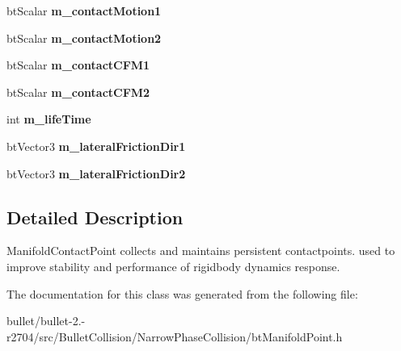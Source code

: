 \begin{DoxyCompactItemize}
\item 
\hypertarget{classbt_manifold_point_af980e3d3ddc888ea84fdb7bd9ed47a51}{bt\+Scalar {\bfseries m\+\_\+contact\+Motion1}}\label{classbt_manifold_point_af980e3d3ddc888ea84fdb7bd9ed47a51}

\item 
\hypertarget{classbt_manifold_point_aeb26ea44a60b91d8b87dadf02d61d05d}{bt\+Scalar {\bfseries m\+\_\+contact\+Motion2}}\label{classbt_manifold_point_aeb26ea44a60b91d8b87dadf02d61d05d}

\item 
\hypertarget{classbt_manifold_point_a1f81ad752ad15e975e0a04040a0a1909}{bt\+Scalar {\bfseries m\+\_\+contact\+C\+F\+M1}}\label{classbt_manifold_point_a1f81ad752ad15e975e0a04040a0a1909}

\item 
\hypertarget{classbt_manifold_point_aa4224c3e7075fc9564833e941bd6d6b6}{bt\+Scalar {\bfseries m\+\_\+contact\+C\+F\+M2}}\label{classbt_manifold_point_aa4224c3e7075fc9564833e941bd6d6b6}

\item 
\hypertarget{classbt_manifold_point_ac33796d728ab7b10987937a46522ab7f}{int {\bfseries m\+\_\+life\+Time}}\label{classbt_manifold_point_ac33796d728ab7b10987937a46522ab7f}

\item 
\hypertarget{classbt_manifold_point_af80f9c429485467e0f7c34952e172020}{bt\+Vector3 {\bfseries m\+\_\+lateral\+Friction\+Dir1}}\label{classbt_manifold_point_af80f9c429485467e0f7c34952e172020}

\item 
\hypertarget{classbt_manifold_point_a5aedd18945719e40d141aa15011384eb}{bt\+Vector3 {\bfseries m\+\_\+lateral\+Friction\+Dir2}}\label{classbt_manifold_point_a5aedd18945719e40d141aa15011384eb}

\end{DoxyCompactItemize}


\subsection{Detailed Description}
Manifold\+Contact\+Point collects and maintains persistent contactpoints. used to improve stability and performance of rigidbody dynamics response. 

The documentation for this class was generated from the following file\+:\begin{DoxyCompactItemize}
\item 
bullet/bullet-\/2.-\/r2704/src/\+Bullet\+Collision/\+Narrow\+Phase\+Collision/bt\+Manifold\+Point.\+h\end{DoxyCompactItemize}
